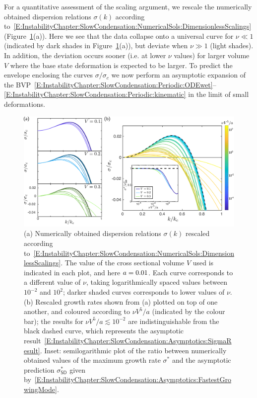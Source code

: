For a quantitative assessment of the scaling argument, we rescale the numerically obtained dispersion relations $\sigma(k)$ according to~\eqref{E:InstabilityChapter:SlowCondensation:NumericalSols:DimensionlessScalings} (Figure~\ref{fig:InstabilityChapter:SlowCondensation:CollapsedGrowthRates}(a)). Here we see that the data collapse onto a universal curve for $\nu \ll 1$ (indicated by dark shades in Figure~\ref{fig:InstabilityChapter:SlowCondensation:CollapsedGrowthRates}(a)), but deviate when $\nu \gg 1$ (light shades). In addition, the deviation occurs sooner (i.e. at lower $\nu$ values) for larger volume $V$ where the base state deformation is expected to be larger. To predict the envelope enclosing the curves $\sigma/\sigma_c$ we now perform an asymptotic expansion of the BVP~\eqref{E:InstabilityChapter:SlowCondensation:Periodic:ODEwet}--\eqref{E:InstabilityChapter:SlowCondensation:Periodic:kinematic} in the limit of small deformations.

\begin{figure}[t]
\centering
\includegraphics[width = \textwidth]{Collapsed_growth_rates}
\caption{(a) Numerically obtained dispersion relations $\sigma(k)$ rescaled according to~\eqref{E:InstabilityChapter:SlowCondensation:NumericalSols:DimensionlessScalings}. The value of the cross sectional volume $V$ used is indicated in each plot, and here $a = 0.01$. Each curve corresponds to a different value of $\nu$, taking logarithmically spaced values between $10^{-2}$ and $10^{2}$; darker shaded curves corresponds to lower values of $\nu$. (b) Rescaled growth rates shown from (a) plotted on top of one another, and coloured according to $\nu V^5 /a$ (indicated by the colour bar); the results for $\nu V^5 /a \lesssim 10^{-2}$ are indistinguishable from the black dashed curve, which represents the asymptotic result~\eqref{E:InstabilityChapter:SlowCondensation:Asymptotics:SigmaResult}. Inset: semilogarithmic plot of the ratio between numerically obtained values of the maximum growth rate $\sigma^*$ and the asymptotic prediction $\sigma^*_{\textsf{SD}}$ given by~\eqref{E:InstabilityChapter:SlowCondensation:Asymptotics:FastestGrowingMode}.}
\label{fig:InstabilityChapter:SlowCondensation:CollapsedGrowthRates}
\end{figure}


